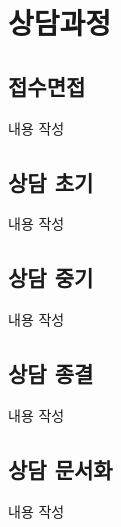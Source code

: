 \section{상담과정}

\subsection{접수면접}
내용 작성

\subsection{상담 초기}
내용 작성

\subsection{상담 중기}
내용 작성

\subsection{상담 종결}
내용 작성

\subsection{상담 문서화}
내용 작성
